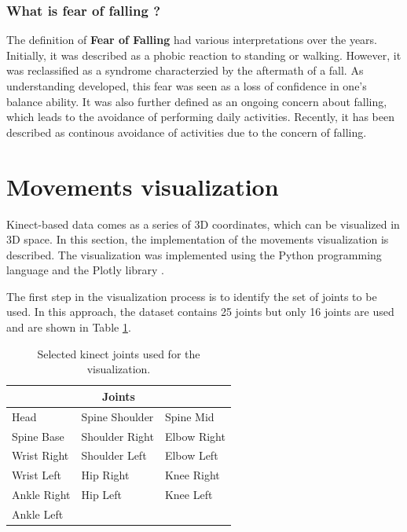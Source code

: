         \subsubsection{What is fear of falling ?}
        
            The definition of \textbf{Fear of Falling} had various interpretations over the years. Initially, it was described as a phobic reaction to standing or walking. However, it was reclassified as a syndrome characterzied by the aftermath of a fall. As understanding developed, this fear was seen as a loss of confidence in one's balance ability. It was also further defined as an ongoing concern about falling, which leads to the avoidance of performing daily activities. Recently, it has been described as continous avoidance of activities due to the concern of falling. \cite{jung_fear_2008}
    
    \section{Movements visualization} \label{sec:movements_visualization}
        
        Kinect-based data comes as a series of 3D coordinates, which can be visualized in 3D space. In this section, the implementation of the movements visualization is described. The visualization was implemented using the Python programming language and the Plotly library \cite{plotly}.

        The first step in the visualization process is to identify the set of joints to be used. In this approach, the dataset contains 25 joints but only 16 joints are used and are shown in Table \ref{tab:joints_selected}. 

        \begin{table}[h]
            \centering
            \caption{Selected kinect joints used for the visualization.}
            \label{tab:joints_selected}
            \begin{tabularx}{0.8\textwidth}{XXX}
                \toprule
                \multicolumn{3}{c}{\textbf{Joints}} \\
                \midrule
                Head & Spine Shoulder & Spine Mid \\
                Spine Base & Shoulder Right & Elbow Right \\
                Wrist Right & Shoulder Left & Elbow Left \\
                Wrist Left & Hip Right & Knee Right \\
                Ankle Right & Hip Left & Knee Left \\
                Ankle Left & & \\
                \bottomrule
            \end{tabularx}
        \end{table}
        
